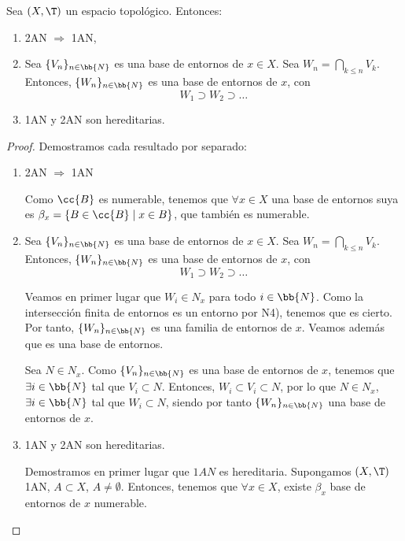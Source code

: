 \begin{prop}\label{prop:AxiomasAN}
    Sea $(X,\T)$ un espacio topológico. Entonces:
    \begin{enumerate}
        \item 2AN $\Longrightarrow$ 1AN,
        \item\label{prop:AxiomasAN_BEIntersec} Sea $\{V_n\}_{n\in \bb{N}}$ es una base de entornos de $x\in X$. Sea $W_n = \bigcap\limits_{k\leq n}V_k$. Entonces, $\{W_n\}_{n\in \bb{N}}$ es una base de entornos de $x$, con
        $$W_1\supset W_2\supset \dots$$
        
        \item 1AN y 2AN son hereditarias.
    \end{enumerate}
\end{prop}
\begin{proof} Demostramos cada resultado por separado:
    \begin{enumerate}
        \item 2AN $\Longrightarrow$ 1AN
    
        Como $\cc{B}$ es numerable, tenemos que $\forall x\in X$ una base de entornos suya es $\beta_x=\{B\in \cc{B}\mid x\in B\}$, que también es numerable.
    
        \item Sea $\{V_n\}_{n\in \bb{N}}$ es una base de entornos de $x\in X$. Sea $W_n = \bigcap\limits_{k\leq n}V_k$. Entonces, $\{W_n\}_{n\in \bb{N}}$ es una base de entornos de $x$, con
        $$W_1\supset W_2\supset \dots$$

        Veamos en primer lugar que $W_i\in N_x$ para todo $i\in \bb{N}$. Como la intersección finita de entornos es un entorno por N4), tenemos que es cierto. Por tanto, $\{W_n\}_{n\in \bb{N}}$ es una familia de entornos de $x$. Veamos además que es una base de entornos.
        
        Sea $N\in N_x$. Como $\{V_n\}_{n\in \bb{N}}$ es una base de entornos de $x$, tenemos que $\exists i\in \bb{N}$ tal que $V_i\subset N$. Entonces, $W_i\subset V_i\subset N$, por lo que $N\in N_x$, $\exists i\in \bb{N}$ tal que $W_i\subset N$, siendo por tanto $\{W_n\}_{n\in \bb{N}}$ una base de entornos de $x$.
    
        \item 1AN y 2AN son hereditarias.

        Demostramos en primer lugar que $1AN$ es hereditaria. Supongamos $(X,\T)$ 1AN, $A\subset X$, $A\neq \emptyset$. Entonces, tenemos que $\forall x\in X$, existe $\beta_x$ base de entornos de $x$ numerable.


\end{enumerate}
\end{proof}
